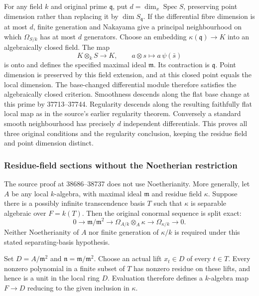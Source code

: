 For any field \(k\) and original prime \(\mathfrak q\), put \(d=\dim_x\operatorname{Spec}S\), preserving point dimension rather than replacing it by \(\dim S_{\mathfrak q}\). If the differential fibre dimension is at most \(d\), finite generation and Nakayama give a principal neighbourhood on which \(\Omega_{S/k}\) has at most \(d\) generators. Choose an embedding \(\kappa(\mathfrak q)\to K\) into an algebraically closed field. The map \[
K\otimes_kS\longrightarrow K,\qquad a\otimes s\longmapsto a\,\psi(\bar s)
\] is onto and defines the specified maximal ideal \(\mathfrak m\). Its contraction is \(\mathfrak q\). Point dimension is preserved by this field extension, and at this closed point equals the local dimension. The base-changed differential module therefore satisfies the algebraically closed criterion. Smoothness descends along the flat base change at this prime by 37713--37744. Regularity descends along the resulting faithfully flat local map as in the source's earlier regularity theorem. Conversely a standard smooth neighbourhood has precisely \(d\) independent differentials. This proves all three original conditions and the regularity conclusion, keeping the residue field and point dimension distinct.

\subsubsection{Residue-field sections without the Noetherian restriction}\label{algebra-proof-049-residue-field-sections-without-the-noetherian-restriction}

The source proof at 38686--38737 does not use Noetherianity. More generally, let \(A\) be any local \(k\)-algebra, with maximal ideal \(\mathfrak m\) and residue field \(\kappa\). Suppose there is a possibly infinite transcendence basis \(T\) such that \(\kappa\) is separable algebraic over \(F=k(T)\). Then the original conormal sequence is split exact: \[
0\longrightarrow\mathfrak m/\mathfrak m^2
\longrightarrow\Omega_{A/k}\otimes_A\kappa
\longrightarrow\Omega_{\kappa/k}\longrightarrow0.
\] Neither Noetherianity of \(A\) nor finite generation of \(\kappa/k\) is required under this stated separating-basis hypothesis.

Set \(D=A/\mathfrak m^2\) and \(\mathfrak n=\mathfrak m/\mathfrak m^2\). Choose an actual lift \(x_t\in D\) of every \(t\in T\). Every nonzero polynomial in a finite subset of \(T\) has nonzero residue on these lifts, and hence is a unit in the local ring \(D\). Evaluation therefore defines a \(k\)-algebra map \(F\to D\) reducing to the given inclusion in \(\kappa\).

